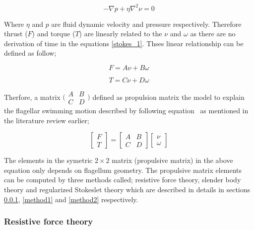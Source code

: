 \documentclass[12pt,a4paper,titlepage]{report}
\begin{document}
\begin{equation}
  -\nabla{p}+ \eta\nabla^2{\nu}  = 0
\label{stokes_1}
\end{equation}

Where $\eta$ and $p$ are fluid dynamic velocity and pressure respectively. Therefore thrust ($F$) and 
torque ($T$) are linearly related to the $\nu$ and $\omega$ as there are no derivation of time in 
the equations \ref{stokes_1}. Thses linear relationship can be defined as follow;


\begin{equation}
  F  = A\nu + B\omega
\label{linear1}
\end{equation}

\begin{equation}
  T = C\nu + D\omega
\label{linear2}
\end{equation}


 Therfore, a matrix 
$\bigl(\begin{smallmatrix}
A&B\\ C&D
\end{smallmatrix} \bigr)$
 defined as propulsion matrix the
model to explain the flagellar swimming motion described by following equation~\citep{rodenborn2013propulsion}
as mentioned in the literature review earlier;
 

\[
\begin{bmatrix} F\\ 
T\end{bmatrix}  = \begin{bmatrix} A & B \\ 
C & D \end{bmatrix}  \begin{bmatrix} \nu
 \\ \omega
\end{bmatrix}
\]

The elements in the symetric $2\times2$ matrix (propulsive matrix) in the above equation only depends on 
flagellum geometry. The propulsive matrix elements can be computed by three methods called;
resistive force theory, slender body theory and regularized Stokeslet theory which are described in details in sections \ref{method3}, 
\ref{method1} and \ref{method2} respectively. 





\subsubsection{Resistive force theory}\label{method3}
\end{document}
